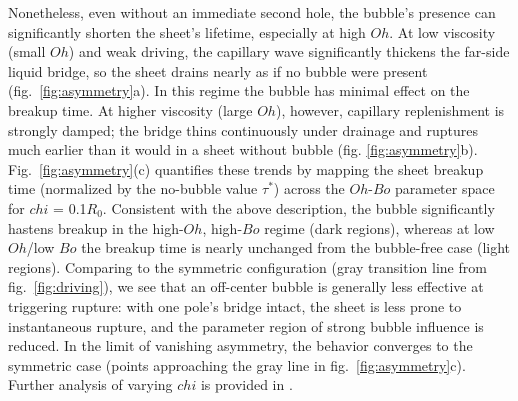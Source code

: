 \documentclass[reprint,amssymb,superscriptaddress,aps,prl,floatfix]{revtex4-2}
\def\chi{chi}%
\begin{document}
Nonetheless, even without an immediate second hole, the bubble's presence can
significantly shorten the sheet's lifetime, especially at high $Oh$. At low viscosity
(small $Oh$) and weak driving, the capillary wave significantly thickens the far-side liquid
bridge, so the sheet drains nearly as if no bubble were present
(fig.~\ref{fig:asymmetry}a). In this regime the bubble has minimal effect on the breakup
time. At higher viscosity (large $Oh$), however, capillary replenishment is strongly
damped; the bridge thins continuously under drainage and ruptures much earlier than it
would in a sheet without bubble (fig. \ref{fig:asymmetry}b).
Fig.~\ref{fig:asymmetry}(c) quantifies these trends by mapping the sheet breakup time
(normalized by the no-bubble value $\tau^{\ast}$) across the $Oh$-$Bo$ parameter space for ${\chi}$ = 0.1$R_0$.
Consistent with the above description, the bubble significantly hastens
breakup in the high-$Oh$, high-$Bo$ regime (dark regions), whereas at low $Oh$/low $Bo$
the breakup time is nearly unchanged from the bubble-free case (light regions). Comparing
to the symmetric configuration (gray transition line from fig.~\ref{fig:driving}), we see
that an off-center bubble is generally less effective at triggering rupture: with one
pole's bridge intact, the sheet is less prone to instantaneous rupture, and the parameter
region of strong bubble influence is reduced. In the limit of vanishing asymmetry, the
behavior converges to the symmetric case (points approaching the gray line in
fig.~\ref{fig:asymmetry}c). Further analysis of varying ${\chi}$ is provided in
\cite{supplMaterial}.
\end{document}
